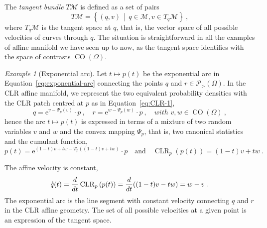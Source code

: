 \documentclass[axioms,article,submit,pdftex,moreauthors]{Definitions/mdpi}
\theoremstyle{plain}
\theoremstyle{remark}
\newtheorem{myexample}{Example}
\newcommand{\CLR}{\operatorname{CLR}}
\newcommand{\clrof}[2]{\CLR_{#1}\left(#2\right)}
\newcommand{\contrastson}[1]{\operatorname{CO}\left(#1\right)}
\newcommand{\derivby}[1]{\frac{d}{d#1}}
\newcommand{\euler}{\mathrm{e}}
\newcommand{\pdensitieson}[1]{\mathcal P_{>}\left(#1\right)}
\newcommand{\setof}[2]{\left\{#1 \, \middle| \, #2 \right\}}
\newcommand{\velocity}[1]{\accentset{\star}{#1}}
\begin{document}
The \emph{tangent bundle} $T \mathcal M$ is defined as a set of pairs 
\begin{equation*} 
T \mathcal M = \setof{(q,v)}{q \in \mathcal M, v \in T_q \mathcal M} \ ,
\end{equation*} 
where $T_q \mathcal M$ is the tangent space at $q$, that is, the vector space of all possible velocities of curves through $q$. The situation is straightforward in all the examples of affine manifold we have seen up to now, as the tangent space identifies with the space of contrasts $\contrastson\Omega$.

\begin{myexample}[Exponential arc] Let $t \mapsto p(t)$ be the exponential arc in Equation~\eqref{eq:exponential-arc} connecting the points $q$ and $r \in \pdensitieson\Omega$. In the CLR affine manifold, we represent the two equivalent probability densities  with the CLR patch centred at $p$ as in Equation~\eqref{eq:CLR-1},
\begin{equation*}
    q = \euler^{v - \Psi_p(v)} \cdot p \ , \quad r = \euler^{w - \Psi_p(w)} \cdot p \ , \quad 
   with \,\, v,w \in \contrastson\Omega \ ,
\end{equation*}
hence the arc $t \mapsto p(t)$ is expressed in terms of a mixture of two random variables $v$ and $w$ and the convex mapping $\Psi_p$, that is, two canonical statistics and the cumulant function,
\begin{equation*}
    p(t) = \euler^{(1-t)v + t w - \Psi_p((1-t) v + t w)} \cdot p \quad \text{and} \quad \clrof p {p(t)} = (1-t) v + t w \ .
\end{equation*}

The affine velocity is constant,
\begin{equation*}\velocity q(t) = \derivby t \clrof p {p(t)} = \derivby t ((1-t)v - tw) = w -v \ .
\end{equation*}
The exponential arc is the line segment with constant velocity connecting $q$ and $r$ in the CLR affine geometry. The set of all possible velocities at a given point is an expression of the tangent space.
\end{myexample}
\end{document}
